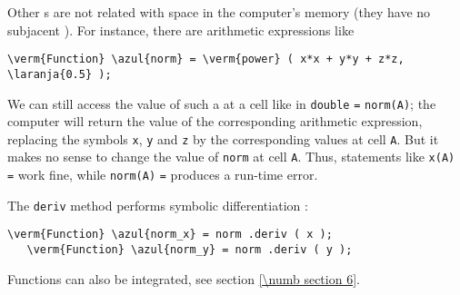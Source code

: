 Other {\small\tt{}}s are not related with space in the computer's memory
(they have no subjacent {\small\tt{}}).
For instance, there are arithmetic expressions like 

\begin{Verbatim}[commandchars=\\\{\},formatcom=\small\tt,baselinestretch=0.94]
   \verm{Function} \azul{norm} = \verm{power} ( x*x + y*y + z*z, \laranja{0.5} );
\end{Verbatim}

We can still access the value of such a {\small\tt{}} at a cell like in
{\small\tt double} {\small\tt{}} {\small\tt =} {\small\tt norm(A)};
the computer will return the value of the corresponding arithmetic expression,
replacing the symbols {\small\tt x}, {\small\tt y} and {\small\tt z} by the corresponding
values at cell {\small\tt A}.
But it makes no sense to change the value of {\small\tt norm} at cell {\small\tt A}.
Thus, statements like {\small\tt x(A)} {\small\tt =} {\small\tt{}} work fine,
while {\small\tt norm(A)} {\small\tt =} {\small\tt{}} produces a run-time error.

The {\small\tt deriv} method performs symbolic differentiation :

\begin{Verbatim}[commandchars=\\\{\},formatcom=\small\tt,
   baselinestretch=0.94,framesep=2mm                     ]
   \verm{Function} \azul{norm_x} = norm .deriv ( x );
   \verm{Function} \azul{norm_y} = norm .deriv ( y );
\end{Verbatim}

Functions can also be integrated, see section \ref{\numb section 6}.


